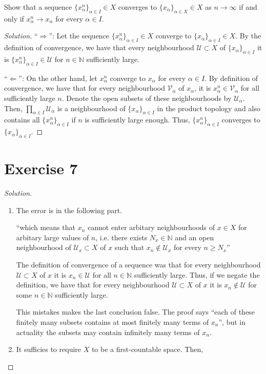\documentclass[a4paper]{article}
\theoremstyle{definition}
\begin{document}
Show that a sequence \(\{x_\alpha^n\}_{\alpha \in I} \in X\) converges to \(\{x_\alpha\}_{\alpha \in X} \in X\) as \(n \longrightarrow \infty\) if and only if \(x^n_\alpha \longrightarrow x_\alpha\) for every \(\alpha \in I\).

\begin{proof}[Solution]
    ``\(\Rightarrow\)'': Let the sequence \(\{x_\alpha^n\}_{\alpha \in I} \in X\) converge to \(\{x_\alpha\}_{\alpha \in I} \in X\). By the definition of convergence, we have that every neighbourhood \(\mathcal{U} \subset X\) of \(\{x_\alpha\}_{\alpha \in I}\) it is \(\{x_\alpha^n\}_{\alpha \in I} \in \mathcal{U}\) for \(n \in \mathbb{N}\) sufficiently large.

    ``\(\Leftarrow\)'': On the other hand, let \(x^n_\alpha\) converge to \(x_\alpha\) for every \(\alpha \in I\). By definition of convergence, we have that for every neighbourhood \(\mathcal{V}_\alpha\) of \(x_\alpha\), it is \(x^n_\alpha \in \mathcal{V}_\alpha\) for all sufficiently large \(n\). Denote the open subsets of these neighbourhoods by \(\mathcal{U}_\alpha\). Then, \(\prod_{\alpha \in I} \mathcal{U}_\alpha\) is a neighbourhood of \(\{x_\alpha\}_{\alpha \in I}\) in the product topology and also contains all \(\{x_\alpha^n\}_{\alpha \in I}\) if \(n\) is sufficiently large enough. Thus, \(\{x_\alpha^n\}_{\alpha \in I}\) converges to \(\{x_\alpha\}_{\alpha \in I}\).
\end{proof}
\section*{Exercise 7}

\begin{proof}[Solution]
    \begin{enumerate}
        \item The error is in the following part.
    
        ``which means that \(x_n\) {\color{red}cannot enter} arbitary neighbourhoods of \(x \in X\) for arbitary large values of \(n\), i.e. there exists \(N_x \in \mathbb{N}\) and an open neighbourhood of \(\mathcal{U}_x \subset X\) of \(x\) such that \(x_n \not\in \mathcal{U}_x\) {\color{red}for every} \(n \geq N_x\)''
    
        The definition of convergence of a sequence was that for every neighbourhood \(\mathcal{U} \subset X\) of \(x\) it is \(x_n \in \mathcal{U}\) for all \(n \in \mathbb{N}\) sufficiently large. Thus, if we negate the definition, we have that for every neighbourhood \(\mathcal{U} \subset X\) of \(x\) it is \(x_n \not\in \mathcal{U}\) {\color{red}for some} \(n \in \mathbb{N}\) sufficiently large.
    
        This mistakes makes the last conclusion false. The proof says ``each of these finitely many subsets contains at most finitely many terms of \(x_n\)'', but in actuality the subsets may contain infinitely many terms of \(x_n\).
        \item It sufficies to require \(X\) to be a first-countable space. Then, 
    \end{enumerate}
\end{proof}
\end{document}
